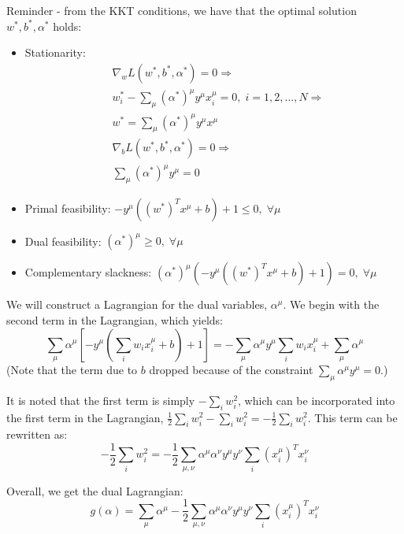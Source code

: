 \documentclass[11pt]{book} %
\begin{document}
Reminder - from the KKT conditions, we have that the optimal solution $w^*, b^*, \alpha^*$ holds:
\begin{itemize}
    \item Stationarity: 
    \begin{align*} 
        &\nabla_w L(w^*, b^*, \alpha^*) = 0 \Rightarrow \\
        &w_i^* - \sum_{\mu} (\alpha^*)^{\mu} y^{\mu} x_i^{\mu} = 0, \; i = 1, 2, \ldots, N \Rightarrow \\
        &w^* = \sum_{\mu} (\alpha^*)^{\mu} y^{\mu} x^{\mu} \\
        &\nabla_b L(w^*, b^*, \alpha^*) = 0 \Rightarrow \\
        &\sum_{\mu} (\alpha^*)^{\mu} y^{\mu} = 0
    \end{align*}
    \item Primal feasibility: \( -y^{\mu}((w^*)^T x^{\mu} + b) + 1 \leq 0, \; \forall \mu \)
    \item Dual feasibility: \((\alpha^*)^{\mu} \geq 0, \; \forall \mu \)
    \item Complementary slackness: \((\alpha^*)^{\mu} (-y^{\mu}((w^*)^T x^{\mu} + b) + 1) = 0, \; \forall \mu \)
\end{itemize}
We will construct a Lagrangian for the dual variables, $\alpha^\mu$. 
We begin with the second term in the Lagrangian, which yields:
\begin{equation}
    \sum_{\mu} \alpha^{\mu} \left[ -y^{\mu} \left( \sum_{i} w_i x_i^{\mu} + b \right) + 1 \right] = - \sum_{\mu} \alpha^{\mu} y^{\mu} \sum_{i} w_i x_i^{\mu} + \sum_{\mu} \alpha^{\mu} 
\end{equation}
(Note that the term due to $b$ dropped because of the constraint $\sum_{\mu} \alpha^{\mu} y^{\mu} = 0$.)

It is noted that the first term is simply $-\sum_{i} w_i^2$, which can be incorporated into the first term in the Lagrangian,
 $\frac{1}{2} \sum_{i} w_i^2 - \sum_{i} w_i^2 = -\frac{1}{2} \sum_{i} w_i^2$. This term can be rewritten as:
\begin{equation}
    -\frac{1}{2} \sum_{i} w_i^2 = -\frac{1}{2} \sum_{\mu,\nu} \alpha^{\mu} \alpha^{\nu} y^{\mu} y^{\nu} \sum_{i} (x_i^{\mu})^T x_i^{\nu} 
\end{equation}

Overall, we get the dual Lagrangian:
\begin{equation}
    g(\alpha) = \sum_{\mu} \alpha^{\mu} - \frac{1}{2} \sum_{\mu,\nu} \alpha^{\mu} \alpha^{\nu} y^{\mu} y^{\nu} \sum_{i} (x_i^{\mu})^T x_i^{\nu} 
\end{equation}
\end{document}
